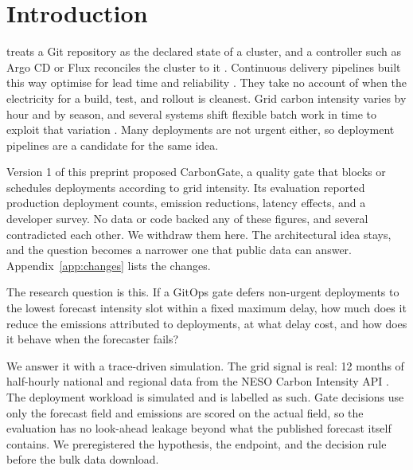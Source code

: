 \documentclass[journal]{IEEEtran}
\begin{document}
\IEEEpeerreviewmaketitle

\section{Introduction}
\label{sec:intro}
 treats a Git repository as the declared state of a cluster, and a controller such as Argo CD or Flux reconciles the cluster to it \cite{beetz2022gitops,argocd,fluxcd}. Continuous delivery pipelines built this way optimise for lead time and reliability \cite{shahin2017continuous}. They take no account of when the electricity for a build, test, and rollout is cleanest. Grid carbon intensity varies by hour and by season, and several systems shift flexible batch work in time to exploit that variation \cite{wiesner2021let,radovanovic2023carbon,hanafy2023carbonscaler}. Many deployments are not urgent either, so deployment pipelines are a candidate for the same idea.

Version 1 of this preprint proposed CarbonGate, a quality gate that blocks or schedules deployments according to grid intensity. Its evaluation reported production deployment counts, emission reductions, latency effects, and a developer survey. No data or code backed any of these figures, and several contradicted each other. We withdraw them here. The architectural idea stays, and the question becomes a narrower one that public data can answer. Appendix~\ref{app:changes} lists the changes.

The research question is this. If a GitOps gate defers non-urgent deployments to the lowest forecast intensity slot within a fixed maximum delay, how much does it reduce the emissions attributed to deployments, at what delay cost, and how does it behave when the forecaster fails?

We answer it with a trace-driven simulation. The grid signal is real: 12 months of half-hourly national and regional data from the NESO Carbon Intensity API \cite{nesoapi}. The deployment workload is simulated and is labelled as such. Gate decisions use only the forecast field and emissions are scored on the actual field, so the evaluation has no look-ahead leakage beyond what the published forecast itself contains. We preregistered the hypothesis, the endpoint, and the decision rule before the bulk data download.
\end{document}
